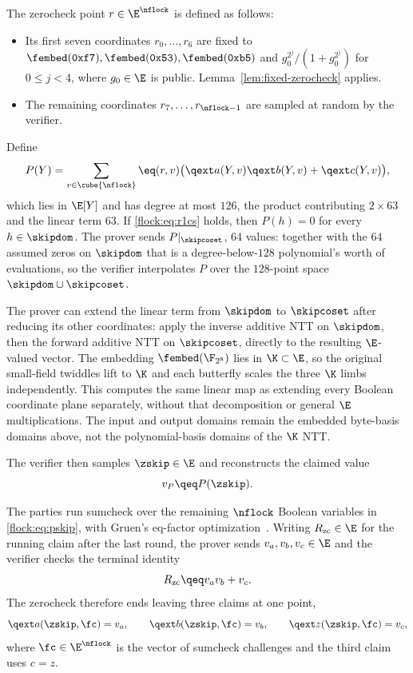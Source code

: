 The zerocheck point $r \in \E^{\nflock}$ is defined as follows:
\begin{itemize}
  \item Its first seven coordinates $r_0, \dots, r_6$ are fixed to $\fembed(\mathtt{0xf7}),\fembed(\mathtt{0x53}),\fembed(\mathtt{0xb5})$ and $g_0^{2^j}/(1+g_0^{2^j})$ for $0\leq j<4$, where $g_0\in\E$ is public. Lemma~\ref{lem:fixed-zerocheck} applies.
  \item The remaining coordinates $r_7,\dots,r_{\nflock-1}$ are sampled at random by the verifier.
\end{itemize}

Define
\begin{equation}\label{flock:eq:pskip}
P(Y)=\sum_{v\in\cube{\nflock}}\eq(r,v)\bigl(\qext a(Y,v)\qext b(Y,v)+\qext c(Y,v)\bigr),
\end{equation}
which lies in $\E[Y]$ and has degree at most $126$, the product contributing $2\times 63$ and the linear term $63$. If \eqref{flock:eq:r1cs} holds, then $P(h)=0$ for every $h\in\skipdom$. The prover sends $P|_{\skipcoset}$, $64$ values: together with the $64$ assumed zeros on $\skipdom$ that is a degree-below-$128$ polynomial's worth of evaluations, so the verifier interpolates $P$ over the $128$-point space $\skipdom\cup\skipcoset$.

The prover can extend the linear term from $\skipdom$ to $\skipcoset$ after reducing its other coordinates: apply the inverse additive NTT on $\skipdom$, then the forward additive NTT on $\skipcoset$, directly to the resulting $\E$-valued vector. The embedding $\fembed(\F_{2^8})$ lies in $\K\subset\E$, so the original small-field twiddles lift to $\K$ and each butterfly scales the three $\K$ limbs independently. This computes the same linear map as extending every Boolean coordinate plane separately, without that decomposition or general $\E$ multiplications. The input and output domains remain the embedded byte-basis domains above, not the polynomial-basis domains of the $\K$ NTT.

The verifier then samples $\zskip\in\E$ and reconstructs the claimed value
\[
v_P \qeq P(\zskip).
\]

The parties run sumcheck over the remaining $\nflock$ Boolean variables in \eqref{flock:eq:pskip}, with Gruen's eq-factor optimization~\cite{Gru24}. Writing $R_{\mathrm{zc}}\in\E$ for the running claim after the last round, the prover sends $v_a,v_b,v_c\in\E$ and the verifier checks the terminal identity
\begin{equation}\label{flock:eq:zc-terminal}
R_{\mathrm{zc}}\qeq v_av_b+v_c.
\end{equation}
The zerocheck therefore ends leaving three claims at one point,
\begin{equation}\label{flock:eq:zc-claims}
\qext a(\zskip,\fc)=v_a,\qquad \qext b(\zskip,\fc)=v_b,\qquad \qext z(\zskip,\fc)=v_c,
\end{equation}
where $\fc\in\E^{\nflock}$ is the vector of sumcheck challenges and the third claim uses $c=z$.

